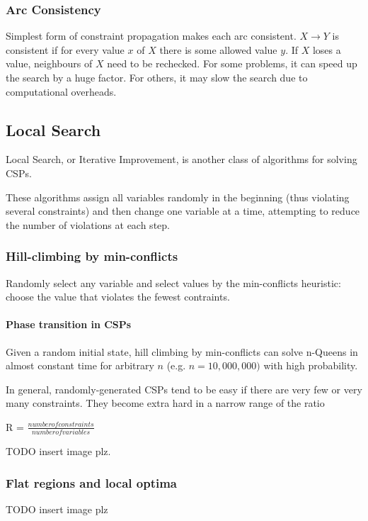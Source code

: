 \subsubsection{Arc Consistency}
Simplest form of constraint propagation makes each arc consistent. $X
\rightarrow Y$ is consistent if for every value $x$ of $X$ there is some
allowed value $y$. If $X$ loses a value, neighbours of $X$ need to be
rechecked. For some problems, it can speed up the search by a huge factor. For
others, it may slow the search due to computational overheads.

\subsection{Local Search}
Local Search, or Iterative Improvement, is another class of algorithms for
solving CSPs.

These algorithms assign all variables randomly in the beginning (thus violating
several constraints) and then change one variable at a time, attempting to
reduce the number of violations at each step.

\subsubsection{Hill-climbing by min-conflicts}
Randomly select any variable and select values by the min-conflicts heuristic:
choose the value that violates the fewest contraints.

\paragraph{Phase transition in CSPs}
Given a random initial state, hill climbing by min-conflicts can solve n-Queens
in almost constant time for arbitrary $n$ (e.g. $n = 10,000,000)$ with high
probability.

In general, randomly-generated CSPs tend to be easy if there are very few or
very many constraints. They become extra hard in a narrow range of the ratio

{\centering R = $\frac{number of constraints}{number of variables}$

}

TODO insert image plz.

\subsubsection{Flat regions and local optima}
TODO insert image plz

